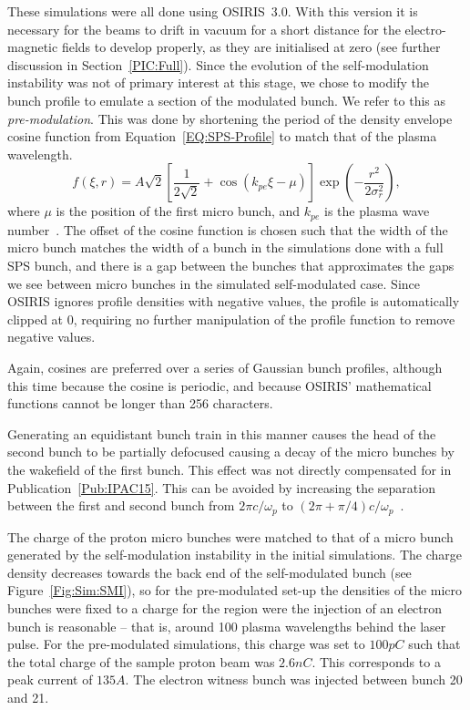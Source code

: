 These simulations were all done using OSIRIS~3.0.
With this version it is necessary for the beams to drift in vacuum for a short distance for the electro-magnetic fields to develop properly, as they are initialised at zero (see further discussion in Section~\ref{PIC:Full}).
Since the evolution of the self-modulation instability was not of primary interest at this stage, we chose to modify the bunch profile to emulate a section of the modulated bunch.
We refer to this as \textit{pre-modulation}.
This was done by shortening the period of the density envelope cosine function from Equation~\ref{EQ:SPS-Profile} to match that of the plasma wavelength.
\begin{equation}
    f(\xi,r) = A\sqrt{2} \left[\frac{1}{2\sqrt{2}}
             + \cos\left(k_{pe}\xi - \mu\right)\right] \exp\left(-\frac{r^{2}}{2\sigma_{r}^{2}}\right), \label{EQ:PB-PreMod}
\end{equation}
where $\mu$ is the position of the first micro bunch, and $k_{pe}$ is the plasma wave number~\cite{berglyd_olsen:2015}.
The offset of the cosine function is chosen such that the width of the micro bunch matches the width of a bunch in the simulations done with a full SPS bunch, and there is a gap between the bunches that approximates the gaps we see between micro bunches in the simulated self-modulated case.
Since OSIRIS ignores profile densities with negative values, the profile is automatically clipped at $0$, requiring no further manipulation of the profile function to remove negative values.

Again, cosines are preferred over a series of Gaussian bunch profiles, although this time because the cosine is periodic, and because OSIRIS' mathematical functions cannot be longer than 256 characters.

Generating an equidistant bunch train in this manner causes the head of the second bunch to be partially defocused causing a decay of the micro bunches by the wakefield of the first bunch.
This effect was not directly compensated for in Publication~\ref{Pub:IPAC15}.
This can be avoided by increasing the separation between the first and second bunch from $2\pi c/\omega_p$ to $(2\pi+\pi/4) c/\omega_p$~\cite{lotov:2018}.

The charge of the proton micro bunches were matched to that of a micro bunch generated by the self-modulation instability in the initial simulations.
The charge density decreases towards the back end of the self-modulated bunch (see Figure~\ref{Fig:Sim:SMI}), so for the pre-modulated set-up the densities of the micro bunches were fixed to a charge for the region were the injection of an electron bunch is reasonable -- that is, around 100 plasma wavelengths behind the laser pulse.
For the pre-modulated simulations, this charge was set to $100\unit{pC}$ such that the total charge of the sample proton beam was $2.6\unit{nC}$.
This corresponds to a peak current of $135\unit{A}$.
The electron witness bunch was injected between bunch 20 and 21.

